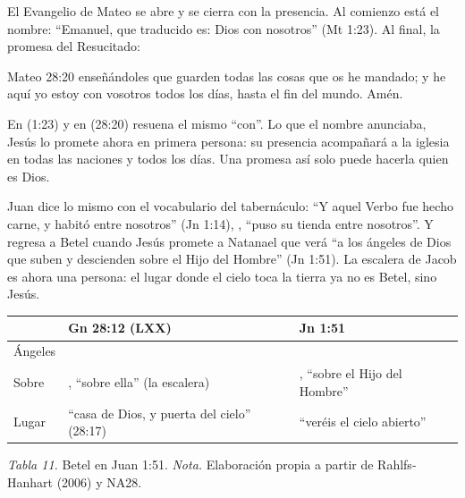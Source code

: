 El Evangelio de Mateo se abre y se cierra con la presencia. Al comienzo está el nombre: ``Emanuel, que traducido es: Dios con nosotros'' (Mt 1:23). Al final, la promesa del Resucitado:

\begin{verso}{Mateo 28:20}
enseñándoles que guarden todas las cosas que os he mandado; y he aquí yo estoy con vosotros todos los días, hasta el fin del mundo. Amén.
\end{verso}

En  (1:23) y en  (28:20) resuena el mismo ``con''. Lo que el nombre anunciaba, Jesús lo promete ahora en primera persona: su presencia acompañará a la iglesia en todas las naciones y todos los días. Una promesa así solo puede hacerla quien es Dios.


Juan dice lo mismo con el vocabulario del tabernáculo: ``Y aquel Verbo fue hecho carne, y habitó entre nosotros'' (Jn 1:14), , ``puso su tienda entre nosotros''. Y regresa a Betel cuando Jesús promete a Natanael que verá ``a los ángeles de Dios que suben y descienden sobre el Hijo del Hombre'' (Jn 1:51). La escalera de Jacob es ahora una persona: el lugar donde el cielo toca la tierra ya no es Betel, sino Jesús.

\begin{center}\small\renewcommand{\arraystretch}{1.2}
\begin{tabular}{@{}L{2.4cm}L{5.8cm}L{5.8cm}@{}}
\toprule
 & \textbf{Gn 28:12 (LXX)} & \textbf{Jn 1:51} \\ \midrule
Ángeles &  &  \\
Sobre & , ``sobre ella'' (la escalera) & , ``sobre el Hijo del Hombre'' \\
Lugar & ``casa de Dios, y puerta del cielo'' (28:17) & ``veréis el cielo abierto'' \\
\bottomrule
\end{tabular}\par
{\footnotesize\color{gris}\textit{Tabla 11.} Betel en Juan 1:51. \textit{Nota.} Elaboración propia a partir de Rahlfs-Hanhart (2006) y NA28.}
\end{center}

